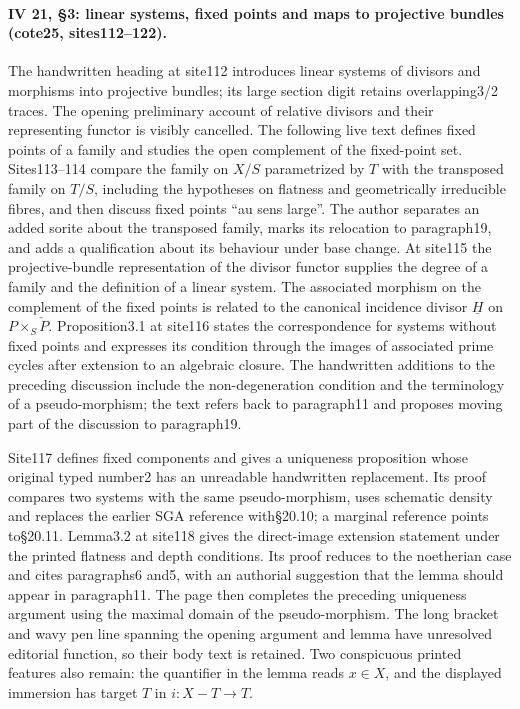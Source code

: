 \paragraph{IV 21, \S3: linear systems, fixed points and maps to projective bundles (cote25, sites112--122).}
The handwritten heading at site112 introduces linear systems of divisors and morphisms into projective bundles; its large section digit retains overlapping3/2 traces. The opening preliminary account of relative divisors and their representing functor is visibly cancelled. The following live text defines fixed points of a family and studies the open complement of the fixed-point set. Sites113--114 compare the family on $X/S$ parametrized by $T$ with the transposed family on $T/S$, including the hypotheses on flatness and geometrically irreducible fibres, and then discuss fixed points ``au sens large''. The author separates an added sorite about the transposed family, marks its relocation to paragraph19, and adds a qualification about its behaviour under base change. At site115 the projective-bundle representation of the divisor functor supplies the degree of a family and the definition of a linear system. The associated morphism on the complement of the fixed points is related to the canonical incidence divisor $\underline H$ on $P\times_S\check P$. Proposition3.1 at site116 states the correspondence for systems without fixed points and expresses its condition through the images of associated prime cycles after extension to an algebraic closure. The handwritten additions to the preceding discussion include the non-degeneration condition and the terminology of a pseudo-morphism; the text refers back to paragraph11 and proposes moving part of the discussion to paragraph19.

Site117 defines fixed components and gives a uniqueness proposition whose original typed number2 has an unreadable handwritten replacement. Its proof compares two systems with the same pseudo-morphism, uses schematic density and replaces the earlier SGA reference with\S20.10; a marginal reference points to\S20.11. Lemma3.2 at site118 gives the direct-image extension statement under the printed flatness and depth conditions. Its proof reduces to the noetherian case and cites paragraphs6 and5, with an authorial suggestion that the lemma should appear in paragraph11. The page then completes the preceding uniqueness argument using the maximal domain of the pseudo-morphism. The long bracket and wavy pen line spanning the opening argument and lemma have unresolved editorial function, so their body text is retained. Two conspicuous printed features also remain: the quantifier in the lemma reads $x\in X$, and the displayed immersion has target $T$ in $i:X-T\to T$.

